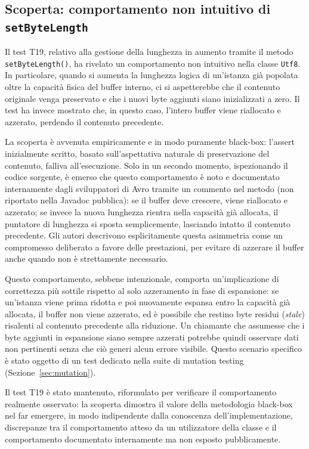 \subsection{Scoperta: comportamento non intuitivo di \texttt{setByteLength}}

Il test T19, relativo alla gestione della lunghezza in aumento tramite
il metodo \texttt{setByteLength()}, ha rivelato un comportamento non
intuitivo nella classe \texttt{Utf8}. In particolare, quando si aumenta
la lunghezza logica di un'istanza già popolata oltre la capacità
fisica del buffer interno, ci si aspetterebbe che il contenuto
originale venga preservato e che i nuovi byte aggiunti siano
inizializzati a zero. Il test ha invece mostrato che, in questo caso,
l'intero buffer viene riallocato e azzerato, perdendo il contenuto
precedente.

La scoperta è avvenuta empiricamente e in modo puramente black-box:
l'assert inizialmente scritto, basato sull'aspettativa naturale di
preservazione del contenuto, falliva all'esecuzione. Solo in un
secondo momento, ispezionando il codice sorgente, è emerso che questo
comportamento è noto e documentato internamente dagli sviluppatori di
Avro tramite un commento nel metodo (non riportato nella Javadoc
pubblica): se il buffer deve crescere, viene riallocato e azzerato;
se invece la nuova lunghezza rientra nella capacità già allocata, il
puntatore di lunghezza si sposta semplicemente, lasciando intatto il
contenuto precedente. Gli autori descrivono esplicitamente questa
asimmetria come un compromesso deliberato a favore delle prestazioni,
per evitare di azzerare il buffer anche quando non è strettamente
necessario.

Questo comportamento, sebbene intenzionale, comporta un'implicazione
di correttezza più sottile rispetto al solo azzeramento in fase di
espansione: se un'istanza viene prima ridotta e poi nuovamente
espansa entro la capacità già allocata, il buffer non viene azzerato,
ed è possibile che restino byte residui (\emph{stale}) risalenti al
contenuto precedente alla riduzione. Un chiamante che assumesse che i
byte aggiunti in espansione siano sempre azzerati potrebbe quindi
osservare dati non pertinenti senza che ciò generi alcun errore
visibile. Questo scenario specifico è stato oggetto di un test
dedicato nella suite di mutation testing (Sezione~\ref{sec:mutation}).

Il test T19 è stato mantenuto, riformulato per verificare il
comportamento realmente osservato: la scoperta dimostra il valore
della metodologia black-box nel far emergere, in modo indipendente
dalla conoscenza dell'implementazione, discrepanze tra il
comportamento atteso da un utilizzatore della classe e il
comportamento documentato internamente ma non esposto pubblicamente.


